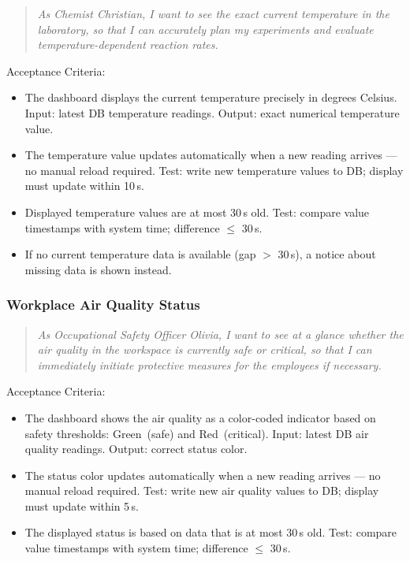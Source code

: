 \documentclass[conference,a4paper,flushend]{cs-techrep} %
\begin{document}
\begin{quote}
    \textit{As Chemist Christian, I want to see the exact current temperature in the laboratory, so that I can accurately plan 
    my experiments and evaluate temperature-dependent reaction rates.}
\end{quote}

Acceptance Criteria:
\begin{itemize}
    \item The dashboard displays the current temperature precisely in degrees Celsius. Input: latest DB temperature readings. 
    Output: exact numerical temperature value.
    \item The temperature value updates automatically when a new reading arrives — no manual reload required. Test: write 
    new temperature values to DB; display must update within 10\,s.
    \item Displayed temperature values are at most 30\,s old. Test: compare value timestamps with system time; difference $\le$ 30\,s.
    \item If no current temperature data is available (gap $>$ 30\,s), a notice about missing data is shown instead.
\end{itemize}

\medskip
\subsubsection{Workplace Air Quality Status}\label{sec:us_02}

\begin{quote}
    \textit{As Occupational Safety Officer Olivia, I want to see at a glance whether the air quality in the workspace is currently 
    safe or critical, so that I can immediately initiate protective measures for the employees if necessary.}
\end{quote}

Acceptance Criteria:
\begin{itemize}
    \item The dashboard shows the air quality as a color-coded indicator based on safety thresholds: Green~(safe) and Red~(critical). 
    Input: latest DB air quality readings. Output: correct status color.
    \item The status color updates automatically when a new reading arrives — no manual reload required.
     Test: write new air quality values to DB; display must update within 5\,s.
    \item The displayed status is based on data that is at most 30\,s old. Test: 
    compare value timestamps with system time; difference $\le$ 30\,s.
\end{itemize}
\end{document}

